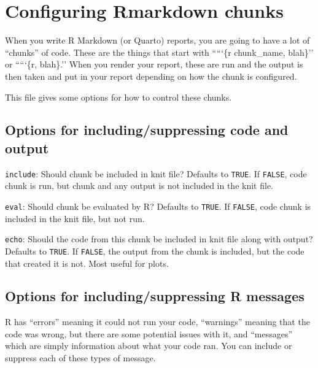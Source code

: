 \documentclass[
  letterpaper,
  DIV=11,
  numbers=noendperiod]{scrreprt}
\begin{document}
\hypertarget{section}{%
\subsection{}\label{section}}

\hypertarget{configuring-rmarkdown-chunks}{%
\chapter{Configuring Rmarkdown
chunks}\label{configuring-rmarkdown-chunks}}

When you write R Markdown (or Quarto) reports, you are going to have a
lot of ``chunks'' of code. These are the things that start with `````\{r
chunk\_name, blah\}'' or `````\{r, blah\}.'' When you render your
report, these are run and the output is then taken and put in your
report depending on how the chunk is configured.

This file gives some options for how to control these chunks.

\hypertarget{options-for-includingsuppressing-code-and-output}{%
\section{Options for including/suppressing code and
output}\label{options-for-includingsuppressing-code-and-output}}

\texttt{include}: Should chunk be included in knit file? Defaults to
\texttt{TRUE}. If \texttt{FALSE}, code chunk is run, but chunk and any
output is not included in the knit file.

\texttt{eval}: Should chunk be evaluated by R? Defaults to
\texttt{TRUE}. If \texttt{FALSE}, code chunk is included in the knit
file, but not run.

\texttt{echo}: Should the code from this chunk be included in knit file
along with output? Defaults to \texttt{TRUE}. If \texttt{FALSE}, the
output from the chunk is included, but the code that created it is not.
Most useful for plots.

\hypertarget{options-for-includingsuppressing-r-messages}{%
\section{Options for including/suppressing R
messages}\label{options-for-includingsuppressing-r-messages}}

R has ``errors'' meaning it could not run your code, ``warnings''
meaning that the code was wrong, but there are some potential issues
with it, and ``messages'' which are simply information about what your
code ran. You can include or suppress each of these types of message.
\end{document}
